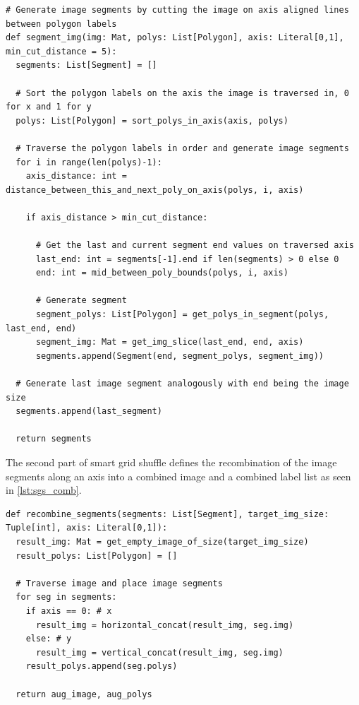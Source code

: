 \documentclass[10pt]{book}
\newenvironment{code}{\captionsetup{type=listing}}{}
\begin{document}
\begin{code}
\label{lst:sgs_cut}
\begin{verbatim}
# Generate image segments by cutting the image on axis aligned lines between polygon labels
def segment_img(img: Mat, polys: List[Polygon], axis: Literal[0,1], min_cut_distance = 5):
  segments: List[Segment] = []
  
  # Sort the polygon labels on the axis the image is traversed in, 0 for x and 1 for y
  polys: List[Polygon] = sort_polys_in_axis(axis, polys)
  
  # Traverse the polygon labels in order and generate image segments
  for i in range(len(polys)-1):
    axis_distance: int = distance_between_this_and_next_poly_on_axis(polys, i, axis)

    if axis_distance > min_cut_distance:

      # Get the last and current segment end values on traversed axis 
      last_end: int = segments[-1].end if len(segments) > 0 else 0
      end: int = mid_between_poly_bounds(polys, i, axis)

      # Generate segment
      segment_polys: List[Polygon] = get_polys_in_segment(polys, last_end, end)
      segment_img: Mat = get_img_slice(last_end, end, axis)
      segments.append(Segment(end, segment_polys, segment_img))

  # Generate last image segment analogously with end being the image size
  segments.append(last_segment)
  
  return segments
\end{verbatim}
\end{code}

The second part of smart grid shuffle defines the recombination of the image segments along an axis into a combined image and a combined label list as seen in \autoref{lst:sgs_comb}.

\begin{code}
\label{lst:sgs_comb}
\begin{verbatim}
def recombine_segments(segments: List[Segment], target_img_size: Tuple[int], axis: Literal[0,1]):
  result_img: Mat = get_empty_image_of_size(target_img_size)
  result_polys: List[Polygon] = []

  # Traverse image and place image segments
  for seg in segments:
    if axis == 0: # x
      result_img = horizontal_concat(result_img, seg.img)
    else: # y
      result_img = vertical_concat(result_img, seg.img)
    result_polys.append(seg.polys)
    
  return aug_image, aug_polys
\end{verbatim}
\end{code}
\end{document}
